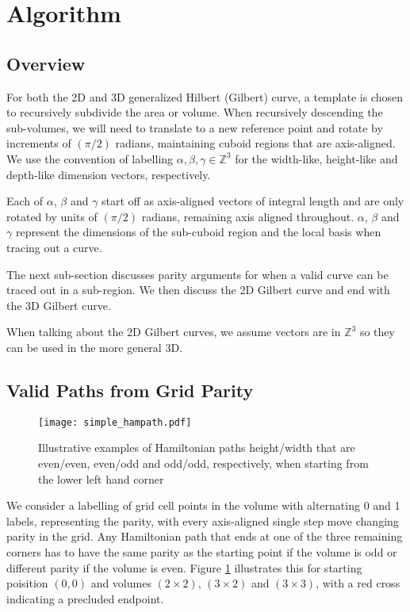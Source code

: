 \section{Algorithm}

\subsection{Overview}

For both the 2D and 3D generalized Hilbert (Gilbert) curve, a template is chosen
to recursively subdivide the area or volume.
When recursively descending the sub-volumes, we will need to translate to
a new reference point and rotate by increments of $(\pi/2)$ radians, maintaining
cuboid regions that are axis-aligned.
We use the convention of labelling $\alpha, \beta, \gamma \in \mathbb{Z}^3$ for
the width-like, height-like and depth-like dimension vectors, respectively.

Each of $\alpha$, $\beta$ and $\gamma$ start off as axis-aligned vectors of integral
length and are only rotated by units of $(\pi/2)$ radians, remaining axis aligned throughout.
$\alpha$, $\beta$ and $\gamma$ represent the dimensions of the sub-cuboid region
and the local basis when tracing out a curve.

The next sub-section discusses parity arguments for when a valid curve can be
traced out in a sub-region.
We then discuss the 2D Gilbert curve and end with the 3D Gilbert curve.

When talking about the 2D Gilbert curves, we assume vectors are in $\mathbb{Z}^3$
so they can be used in the more general 3D.


\subsection{Valid Paths from Grid Parity}

\begin{figure}[h]
  \centering
  \texttt{[image: simple\_hampath.pdf]}
  \caption{ Illustrative examples of Hamiltonian paths height/width that are even/even, even/odd and odd/odd, respectively,
            when starting from the lower left hand corner }
  \label{fig:exampleHampath}
\end{figure}

We consider a labelling of grid cell points in the volume with alternating 0 and 1 labels, representing the parity,
with every axis-aligned single step move changing parity in the grid.
Any Hamiltonian path that ends at one of the three remaining corners has to have the same parity as the starting point if the
volume is odd or different parity if the volume is even.
Figure \ref{fig:exampleHampath} illustrates this for starting poisition $(0,0)$ and volumes $(2 \times 2)$, $(3 \times 2)$ and $(3 \times 3)$,
with a red cross indicating a precluded endpoint.

